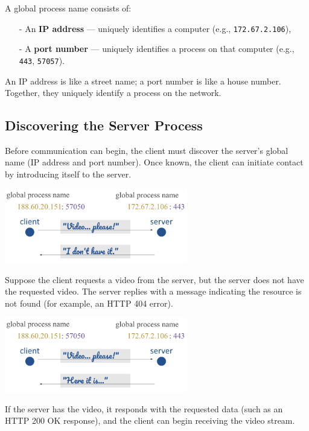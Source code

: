 \documentclass[../../compsys.tex]{subfiles}
\begin{document}
A global process name consists of:
\begin{itemize}
    \item[-] An \textbf{IP address} — uniquely identifies a computer (e.g., \texttt{172.67.2.106}),
    \item[-] A \textbf{port number} — uniquely identifies a process on that computer (e.g., \texttt{443}, \texttt{57057}).
\end{itemize}

An IP address is like a street name; a port number is like a house number. Together, they uniquely identify a process on the network.
\newpage
\subsection{Discovering the Server Process}

Before communication can begin, the client must discover the server's global name (IP address and port number). Once known, the client can initiate contact by introducing itself to the server.

\vspace{0.5em}
\begin{center}
    \includegraphics[width=0.6\textwidth]{images/notfound.png}
\end{center}
Suppose the client requests a video from the server, but the server does not have the requested video. The server replies with a message indicating the resource is not found (for example, an HTTP 404 error).

\vspace{0.5em}
\begin{center}
    \includegraphics[width=0.6\textwidth]{images/success.png}
\end{center}
If the server has the video, it responds with the requested data (such as an HTTP 200 OK response), and the client can begin receiving the video stream.
\end{document}
